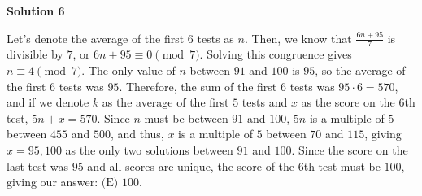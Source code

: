 \begin{enumerate}
 



\textbf{Solution 6}

Let's denote the average of the first $6$ tests as $n$. Then, we know that $\frac{6n + 95}{7}$ is divisible by $7$, or $6n + 95 \equiv 0 \pmod 7$. Solving this congruence gives $n \equiv 4 \pmod 7$. The only value of $n$ between $91$ and $100$ is $95$, so the average of the first $6$ tests was $95$. Therefore, the sum of the first $6$ tests was $95 \cdot 6 = 570$, and if we denote $k$ as the average of the first $5$ tests and $x$ as the score on the $6$th test, $5n + x = 570$. Since $n$ must be between $91$ and $100$, $5n$ is a multiple of $5$ between $455$ and $500$, and thus, $x$ is a multiple of $5$ between $70$ and $115$, giving $x = 95, 100$ as the only two solutions between $91$ and $100$. Since the score on the last test was $95$ and all scores are unique, the score of the 6th test must be $100$, giving our answer: $\boxed{\text{(E) }100}$.

 


\end{enumerate}